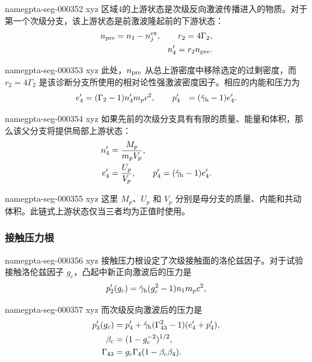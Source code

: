 \documentclass[twocolumn]{aastex702}
\makeatletter
\providecommand{\gptareaderanchor}[1]{\pdfdest name{#1} xyz}%
\providecommand{\gptareaderanchor}[1]{\special{pdf:dest (#1) [ @thispage /XYZ @xpos @ypos null ]}}%
\makeatother
\begin{document}
\gptareaderanchor{gpta-seg-000352}%
区域4的上游状态是次级反向激波传播进入的物质。对于第一个次级分支，该上游状态是前激波隆起前的下游状态：
\begin{equation}
\begin{aligned}
n_{\rm pre}=n_1-n_j^{\rm ex},
\qquad
r_2=4\Gamma_2,
\\
n'_4=r_2 n_{\rm pre}.
\end{aligned}
\end{equation}

\gptareaderanchor{gpta-seg-000353}%
此处，\(n_{\rm pre}\) 从总上游密度中移除选定的过剩密度，而 \(r_2=4\Gamma_2\) 是该诊断分支所使用的相对论性强激波密度因子。相应的内能和压力为
\begin{equation}
\begin{aligned}
e'_4&=(\Gamma_2-1)n'_4m_pc^2,
\qquad
p'_4&=(\hat\gamma_{\rm h}-1)e'_4 .
\end{aligned}
\end{equation}

\gptareaderanchor{gpta-seg-000354}%
如果先前的次级分支具有有限的质量、能量和体积，那么该父分支将提供局部上游状态：
\begin{equation}
\begin{aligned}
n'_4&=\frac{M_p}{m_pV_p},\\
e'_4&=\frac{U_p}{V_p},
\qquad
p'_4=(\hat\gamma_{\rm h}-1)e'_4 .
\end{aligned}
\end{equation}

\gptareaderanchor{gpta-seg-000355}%
这里 \(M_p\)、\(U_p\) 和 \(V_p\) 分别是母分支的质量、内能和共动体积。此链式上游状态仅当三者均为正值时使用。

\subsubsection{接触压力根}


\gptareaderanchor{gpta-seg-000356}%
接触压力根设定了次级接触面的洛伦兹因子。对于试验接触洛伦兹因子 \(g_c\)，凸起中新正向激波后的压力是
\begin{equation}
p'_2(g_c)=
\hat\gamma_{\rm h}(g_c^2-1)n_1m_pc^2,
\end{equation}

\gptareaderanchor{gpta-seg-000357}%
而次级反向激波后的压力是
\begin{equation}
\begin{aligned}
p'_3(g_c)&=
p'_4+\hat\gamma_{\rm h}(\Gamma_{43}^2-1)(e'_4+p'_4),\\
\beta_c&=(1-g_c^{-2})^{1/2},\\
\Gamma_{43}&=g_c\Gamma_4(1-\beta_c\beta_4).
\end{aligned}
\end{equation}
\end{document}
